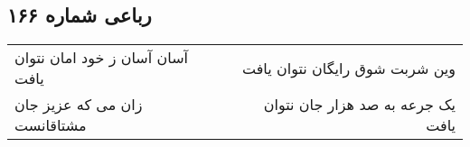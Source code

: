 \begin{center}
\section*{رباعی شماره ۱۶۶}
\label{sec:sh166}
\begin{longtable}{l p{0.5cm} r}
آسان آسان ز خود امان نتوان یافت
&&
وین شربت شوق رایگان نتوان یافت
\\
زان می که عزیز جان مشتاقانست
&&
یک جرعه به صد هزار جان نتوان یافت
\\
\end{longtable}
\end{center}
